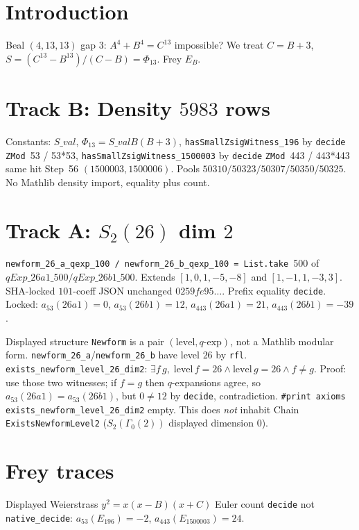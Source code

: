 \documentclass[12pt]{amsart}
\begin{document}
\section{Introduction}
Beal $(4,13,13)$ gap $3$: $A^4+B^4=C^{13}$ impossible? We treat $C=B+3$,
$S=(C^{13}-B^{13})/(C-B)=\Phi_{13}$. Frey $E_B$.

\section{Track B: Density $5983$ rows}
Constants: $S\_val$, $\Phi_{13}=S\_val B(B+3)$, \texttt{hasSmallZsigWitness\_196} by
\texttt{decide} \texttt{ZMod }53 / 53*53, \texttt{hasSmallZsigWitness\_1500003}
by \texttt{decide} \texttt{ZMod }443 / 443*443 same hit Step~56 $(1500003,1500006)$.
Pools $50310/50323/50307/50350/50325$. No Mathlib density import, equality plus count.

\section{Track A: $S_2(26)$ dim $2$}
\texttt{newform\_26\_a\_qexp\_100 / newform\_26\_b\_qexp\_100 = List.take }500
of $qExp\_26a1\_500/qExp\_26b1\_500$. Extends $[1,0,1,-5,-8]$ and $[1,-1,1,-3,3]$.
SHA-locked $101$-coeff JSON unchanged $0259fe95\ldots$. Prefix equality \texttt{decide}.
Locked: $a_{53}(26a1)=0$, $a_{53}(26b1)=12$, $a_{443}(26a1)=21$, $a_{443}(26b1)=-39$.

Displayed structure \texttt{Newform} is a pair $(\mathrm{level},q\text{-exp})$, not a Mathlib modular form.
\texttt{newform\_26\_a}/\texttt{newform\_26\_b} have level $26$ by \texttt{rfl}.
\texttt{exists\_newform\_level\_26\_dim2}: $\exists f\,g,\;\mathrm{level}\,f=26\wedge\mathrm{level}\,g=26\wedge f\neq g$.
Proof: use those two witnesses; if $f=g$ then $q$-expansions agree, so
$a_{53}(26a1)=a_{53}(26b1)$, but $0\neq12$ by \texttt{decide}, contradiction.
\texttt{\#print axioms exists\_newform\_level\_26\_dim2} empty.
This does \emph{not} inhabit Chain \texttt{ExistsNewformLevel2} ($S_2(\Gamma_0(2))$ displayed dimension $0$).

\section{Frey traces}
Displayed Weierstrass $y^2=x(x-B)(x+C)$ Euler count \texttt{decide} not
\texttt{native\_decide}: $a_{53}(E_{196})=-2$, $a_{443}(E_{1500003})=24$.
\end{document}
